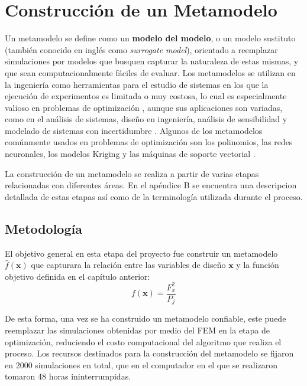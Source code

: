 \chapter{Construcción de un Metamodelo}

Un metamodelo se define como un \textbf{modelo del modelo}, o un modelo sustituto (también conocido en inglés como \textit{surrogate model}), orientado a reemplazar  simulaciones por modelos que busquen capturar la naturaleza de estas mismas, y que sean computacionalmente fáciles de evaluar. Los metamodelos se utilizan en la ingeniería como herramientas para el estudio de sistemas en los que la ejecución de experimentos es limitada o muy costosa, lo cual es especialmente valioso en problemas de optimización \cite{jin2011}, aunque sus aplicaciones son variadas, como en el análisis de sistemas, diseño en ingeniería, análisis de sensibilidad y modelado de sistemas con incertidumbre \cite{forrester2008}. Algunos de los metamodelos comúnmente usados en problemas de optimización son los polinomios, las redes neuronales, los modelos Kriging y las máquinas de soporte vectorial \cite{koziel2013}.

La construcción de un metamodelo se realiza a partir de varias etapas relacionadas con diferentes áreas. En el apéndice B se encuentra una descripcion detallada de estas etapas así como de la terminología utilizada durante el proceso.

\section{Metodología}
El objetivo general en esta etapa del proyecto fue construir un metamodelo $\hat{f}(\mathbf{x})$ que capturara la relación entre las variables de diseño $\mathbf{x}$ y la función objetivo definida en el capítulo anterior:
\begin{equation*}
f(\mathbf{x}) = \frac{F_x^2}{P_j}
\end{equation*}

De esta forma, una vez se ha construido un metamodelo confiable, este puede reemplazar las simulaciones obtenidas por medio del FEM en la etapa de optimización, reduciendo el costo computacional del algoritmo que realiza el proceso. Los recursos destinados para la construcción del metamodelo se fijaron en 2000 simulaciones en total, que en el computador en el que se realizaron tomaron 48 horas ininterrumpidas.

